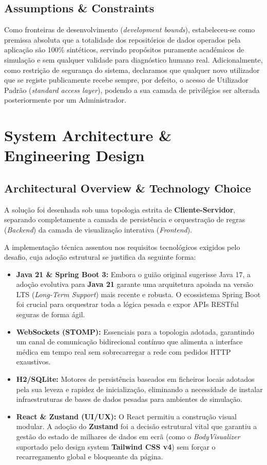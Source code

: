 \documentclass[11pt,a4paper]{article}
\begin{document}
\subsection{Assumptions \& Constraints}
Como fronteiras de desenvolvimento (\textit{development bounds}), estabeleceu-se como premissa absoluta que a totalidade dos repositórios de dados operados pela aplicação são 100\% sintéticos, servindo propósitos puramente académicos de simulação e sem qualquer validade para diagnóstico humano real. Adicionalmente, como restrição de segurança do sistema, declaramos que qualquer novo utilizador que se registe publicamente recebe sempre, por defeito, o acesso de Utilizador Padrão (\textit{standard access layer}), podendo a sua camada de privilégios ser alterada posteriormente por um Administrador.

\section{System Architecture \& Engineering Design}

\subsection{Architectural Overview \& Technology Choice}
A solução foi desenhada sob uma topologia estrita de \textbf{Cliente-Servidor}, separando completamente a camada de persistência e orquestração de regras (\textit{Backend}) da camada de visualização interativa (\textit{Frontend}). 

A implementação técnica assentou nos requisitos tecnológicos exigidos pelo desafio, cuja adoção estrutural se justifica da seguinte forma:
\begin{itemize}[label=\color{accentblue}\bullet]
    \item \textbf{Java 21 \& Spring Boot 3:} Embora o guião original sugerisse Java 17, a adoção evolutiva para \textbf{Java 21} garante uma arquitetura apoiada na versão LTS (\textit{Long-Term Support}) mais recente e robusta. O ecossistema Spring Boot foi crucial para orquestrar toda a lógica pesada e expor APIs RESTful seguras de forma ágil.
    \item \textbf{WebSockets (STOMP):} Essenciais para a topologia adotada, garantindo um canal de comunicação bidirecional contínuo que alimenta a interface médica em tempo real sem sobrecarregar a rede com pedidos HTTP exaustivos.
    \item \textbf{H2/SQLite:} Motores de persistência baseados em ficheiros locais adotados pela sua leveza e rapidez de inicialização, eliminando a necessidade de instalar infraestruturas de bases de dados pesadas para ambientes de simulação.
    \item \textbf{React \& Zustand (UI/UX):} O React permitiu a construção visual modular. A adoção do \textbf{Zustand} foi a decisão estrutural vital que garantiu a gestão do estado de milhares de dados em ecrã (como o \textit{BodyVisualizer} suportado pelo design system \textbf{Tailwind CSS v4}) sem forçar o recarregamento global e bloqueante da página.
\end{itemize}
\end{document}

